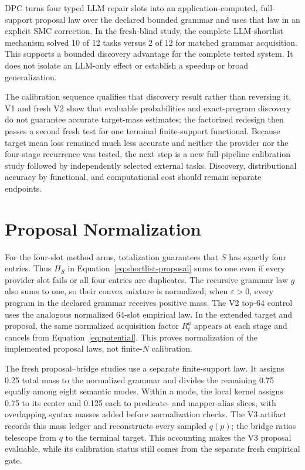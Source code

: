 \documentclass[twoside,11pt]{article}
\newcommand{\method}{\textsc{DPC}\xspace}
\begin{document}
\method turns four typed LLM repair slots into an application-computed,
full-support proposal law over the declared bounded grammar and uses that law
in an explicit SMC correction. In the fresh-blind study, the complete
LLM-shortlist mechanism solved 10 of 12 tasks versus 2 of 12 for matched grammar
acquisition. This supports a bounded discovery advantage for the complete
tested system. It does not isolate an LLM-only effect or establish a speedup or
broad generalization.

The calibration sequence qualifies that discovery result rather than reversing
it. V1 and fresh V2 show that evaluable probabilities and exact-program
discovery do not guarantee accurate target-mass estimates; the factorized
redesign then passes a second fresh test for one terminal finite-support
functional. Because target mean loss remained much less accurate and neither
the provider nor the four-stage recurrence was tested, the next step is a new
full-pipeline calibration study followed by independently selected external
tasks. Discovery, distributional accuracy by functional, and computational cost
should remain separate endpoints.


\appendix

\section{Proposal Normalization}
\label{app:normalization}

For the four-slot method arms, totalization guarantees that $S$ has exactly four
entries. Thus $H_S$ in Equation~\ref{eq:shortlist-proposal} sums to one even if
every provider slot fails or all four entries are duplicates. The recursive
grammar law $g$ also sums to one, so their convex mixture is normalized; when
$\varepsilon>0$, every program in the declared grammar receives positive mass.
The V2 top-64 control uses the analogous normalized 64-slot empirical law. In
the extended target and proposal, the same normalized acquisition factor
$R_t^a$ appears at each stage and cancels from
Equation~\ref{eq:potential}. This proves normalization of the implemented
proposal laws, not finite-$N$ calibration.

The fresh proposal--bridge studies use a separate finite-support law. It assigns
0.25 total mass to the normalized grammar and divides the remaining 0.75
equally among eight semantic modes. Within a mode, the local kernel assigns
0.75 to its center and 0.125 each to predicate- and mapper-alias slices, with
overlapping syntax masses added before normalization checks. The V3 artifact
records this mass ledger and reconstructs every sampled $q(p)$; the bridge
ratios telescope from $q$ to the terminal target. This accounting makes the V3
proposal evaluable, while its calibration status still comes from the separate
fresh empirical gate.
\end{document}
